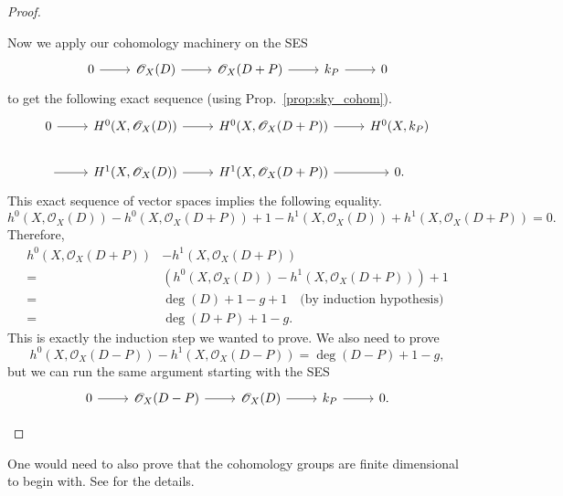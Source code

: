 \begin{proof}
\begin{description}[style=nextline]
          Now we apply our cohomology machinery on the SES
          \[
          \begin{tikzcd}
            0\arrow{r} & \mathscr{O}_X(D)\arrow{r} & \mathscr{O}_X(D+P)\arrow{r}
            & k_{P}\arrow{r} & 0
          \end{tikzcd}
          \]
          to get the following exact sequence (using
          Prop.~\ref{prop:sky_cohom}).
          \[
          \begin{tikzcd}
            0\arrow{r} & H^{0}(X, \mathscr{O}_X(D))\arrow{r}
            & H^{0}(X, \mathscr{O}_X(D+P))\arrow{r}
            & H^{0}(X, k_{P}) \\
            \arrow{r} & H^{1}(X, \mathscr{O}_X(D))\arrow{r}
            & H^{1}(X, \mathscr{O}_X(D+P))\arrow{r} & 0.
          \end{tikzcd}
          \]
          This exact sequence of vector spaces implies the following
          equality.
          \[
          h^{0}(X,\mathscr{O}_X(D))-h^{0}(X, \mathscr{O}_X(D+P))
          +1-h^{1}(X,\mathscr{O}_X(D))+h^{1}(X,\mathscr{O}_X(D+P)) = 0.
          \]
          Therefore,
          \begin{align*}
            h^{0}(X,\mathscr{O}_X(D+P))&-h^{1}(X,\mathscr{O}_X(D+P)) \\
            =&\left(h^{0}(X,\mathscr{O}_X(D))-h^{1}(X,\mathscr{O}_X(D+P))\right)
              +1 \\
            =&\deg(D)+1-g+1\quad\text{(by induction hypothesis)} \\
            =&\deg(D+P)+1-g.
          \end{align*}
          This is exactly the induction step we wanted to prove.
          We also need to prove
          \[
            h^{0}(X,\mathscr{O}_X(D-P))-h^{1}(X,\mathscr{O}_X(D-P))
            =\deg(D-P)+1-g,
          \]
          but we can run the same argument starting with the SES
          \[
          \begin{tikzcd}
            0\arrow{r} & \mathscr{O}_X(D-P)\arrow{r} & \mathscr{O}_X(D)\arrow{r}
            & k_{P}\arrow{r} & 0.
          \end{tikzcd}
          \]
  \end{description}
\end{proof}
\begin{lwarn}
  One would need to also prove that the cohomology groups are finite
  dimensional to begin with. See \cite{serre} for the details.
\end{lwarn}


